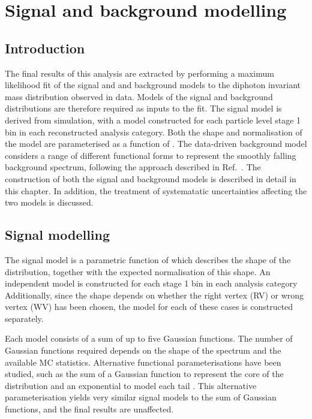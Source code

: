 \chapter{Signal and background modelling}
\label{chap:sigbkg}

\section{Introduction}

The final results of this analysis are extracted by performing a maximum likelihood fit 
of the signal and and background models to the diphoton invariant mass distribution observed in data.
Models of the signal and background \mgg distributions are therefore required as inputs to the fit.
The signal model is derived from simulation, 
with a model constructed for each particle level stage 1 bin in each reconstructed analysis category.
Both the shape and normalisation of the model are parameterised as a function of \mH.
The data-driven background model considers a range of different functional forms to 
represent the smoothly falling background spectrum, 
following the approach described in Ref.~\cite{Envelope}.
The construction of both the signal and background models is described in detail in this chapter.
In addition, the treatment of systematatic uncertainties affecting the two models is discussed.

\section{Signal modelling}

The signal model is a parametric function of \mH which describes the shape of the \mgg distribution, 
together with the expected normalisation of this shape.
An independent model is constructed for each stage 1 bin in each analysis category
Additionally, since the \mgg shape depends on whether the right vertex (RV) 
or wrong vertex (WV) has been chosen, the model for each of these cases is constructed separately.

Each model consists of a sum of up to five Gaussian functions.
The number of Gaussian functions required depends on the shape of the \mgg spectrum 
and the available MC statistics.
Alternative functional parameterisations have been studied, 
such as the sum of a Gaussian function to represent the core of the \mgg distribution 
and an exponential to model each tail \cite{LouieThesis}.
This alternative parameterisation yields very similar signal models to the sum of Gaussian functions, 
and the final results are unaffected.

